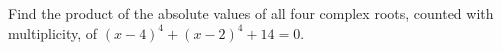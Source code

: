 Find the product of the absolute values of all four complex roots, counted with multiplicity, of $(x-4)^4+(x-2)^4+14=0$.
